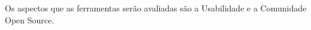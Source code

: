 Os aspectos que as ferramentas serão avaliadas são a Usabilidade e a Comunidade Open Source.



        








